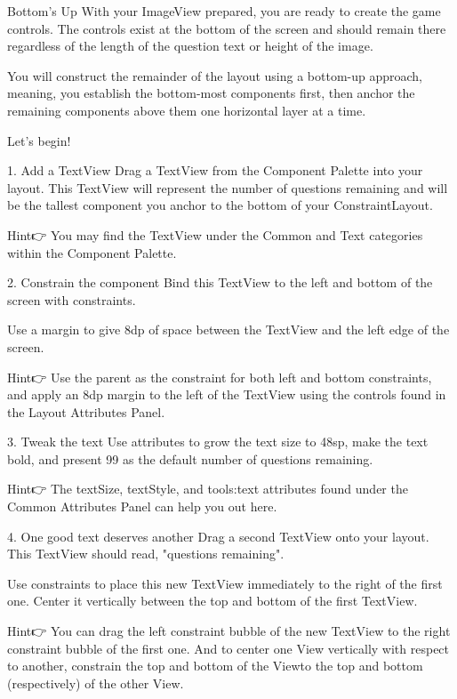 Bottom’s Up
        With your ImageView prepared, you are ready to create the game controls. The controls exist at the bottom of the screen and should remain there regardless of the length of the question text or height of the image.

        You will construct the remainder of the layout using a bottom-up approach, meaning, you establish the bottom-most components first, then anchor the remaining components above them one horizontal layer at a time.

        Let’s begin!

    1. Add a TextView
        Drag a TextView from the Component Palette into your layout. This TextView will represent the number of questions remaining and will be the tallest component you anchor to the bottom of your ConstraintLayout.

        Hint👉 You may find the TextView under the Common and Text categories within the Component Palette.

    2. Constrain the component
        Bind this TextView to the left and bottom of the screen with constraints.

        Use a margin to give 8dp of space between the TextView and the left edge of the screen.

        Hint👉 Use the parent as the constraint for both left and bottom constraints, and apply an 8dp margin to the left of the TextView using the controls found in the Layout Attributes Panel.

    3. Tweak the text
        Use attributes to grow the text size to 48sp, make the text bold, and present 99 as the default number of questions remaining.

        Hint👉 The textSize, textStyle, and tools:text attributes found under the Common Attributes Panel can help you out here.

    4. One good text deserves another
        Drag a second TextView onto your layout. This TextView should read, "questions remaining".

        Use constraints to place this new TextView immediately to the right of the first one. Center it vertically between the top and bottom of the first TextView.

        Hint👉 You can drag the left constraint bubble of the new TextView to the right constraint bubble of the first one.
        And to center one View vertically with respect to another, constrain the top and bottom of the Viewto the top and bottom (respectively) of the other View.

